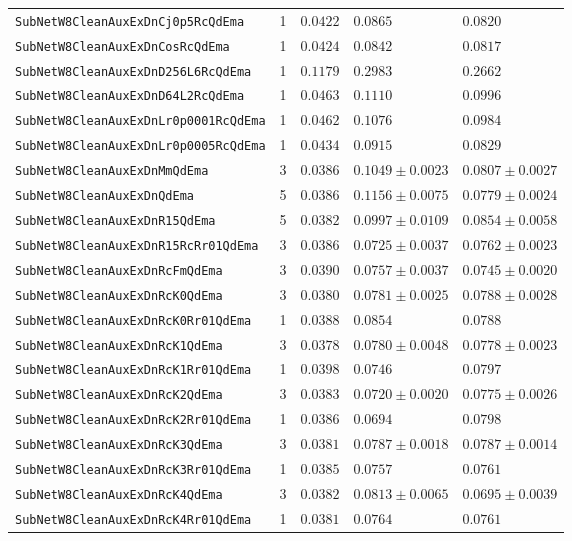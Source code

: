 \begin{longtable}{lrlll}
\texttt{SubNetW8CleanAuxExDnCj0p5RcQdEma} & 1 & $0.0422$ & $0.0865$ & $0.0820$\\
\texttt{SubNetW8CleanAuxExDnCosRcQdEma} & 1 & $0.0424$ & $0.0842$ & $0.0817$\\
\texttt{SubNetW8CleanAuxExDnD256L6RcQdEma} & 1 & $0.1179$ & $0.2983$ & $0.2662$\\
\texttt{SubNetW8CleanAuxExDnD64L2RcQdEma} & 1 & $0.0463$ & $0.1110$ & $0.0996$\\
\texttt{SubNetW8CleanAuxExDnLr0p0001RcQdEma} & 1 & $0.0462$ & $0.1076$ & $0.0984$\\
\texttt{SubNetW8CleanAuxExDnLr0p0005RcQdEma} & 1 & $0.0434$ & $0.0915$ & $0.0829$\\
\texttt{SubNetW8CleanAuxExDnMmQdEma} & 3 & $0.0386$ & $0.1049\pm0.0023$ & $0.0807\pm0.0027$\\
\texttt{SubNetW8CleanAuxExDnQdEma} & 5 & $0.0386$ & $0.1156\pm0.0075$ & $0.0779\pm0.0024$\\
\texttt{SubNetW8CleanAuxExDnR15QdEma} & 5 & $0.0382$ & $0.0997\pm0.0109$ & $0.0854\pm0.0058$\\
\texttt{SubNetW8CleanAuxExDnR15RcRr01QdEma} & 3 & $0.0386$ & $0.0725\pm0.0037$ & $0.0762\pm0.0023$\\
\texttt{SubNetW8CleanAuxExDnRcFmQdEma} & 3 & $0.0390$ & $0.0757\pm0.0037$ & $0.0745\pm0.0020$\\
\texttt{SubNetW8CleanAuxExDnRcK0QdEma} & 3 & $0.0380$ & $0.0781\pm0.0025$ & $0.0788\pm0.0028$\\
\texttt{SubNetW8CleanAuxExDnRcK0Rr01QdEma} & 1 & $0.0388$ & $0.0854$ & $0.0788$\\
\texttt{SubNetW8CleanAuxExDnRcK1QdEma} & 3 & $0.0378$ & $0.0780\pm0.0048$ & $0.0778\pm0.0023$\\
\texttt{SubNetW8CleanAuxExDnRcK1Rr01QdEma} & 1 & $0.0398$ & $0.0746$ & $0.0797$\\
\texttt{SubNetW8CleanAuxExDnRcK2QdEma} & 3 & $0.0383$ & $0.0720\pm0.0020$ & $0.0775\pm0.0026$\\
\texttt{SubNetW8CleanAuxExDnRcK2Rr01QdEma} & 1 & $0.0386$ & $0.0694$ & $0.0798$\\
\texttt{SubNetW8CleanAuxExDnRcK3QdEma} & 3 & $0.0381$ & $0.0787\pm0.0018$ & $0.0787\pm0.0014$\\
\texttt{SubNetW8CleanAuxExDnRcK3Rr01QdEma} & 1 & $0.0385$ & $0.0757$ & $0.0761$\\
\texttt{SubNetW8CleanAuxExDnRcK4QdEma} & 3 & $0.0382$ & $0.0813\pm0.0065$ & $0.0695\pm0.0039$\\
\texttt{SubNetW8CleanAuxExDnRcK4Rr01QdEma} & 1 & $0.0381$ & $0.0764$ & $0.0761$\\

\end{longtable}
